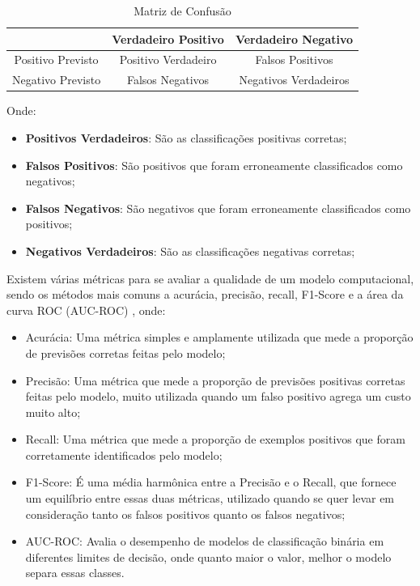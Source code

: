 \documentclass[
    12pt,               %
    openright,          %
    oneside,            %
    a4paper,            %
    english,            %
    brazil              %
    ]{abntex2}
\begin{document}
\begin{table}[H]
    \centering
    \caption{\label{fig:matrix_confusao}Matriz de Confusão}
    \begin{tabular}{|c|c|c|}
    \hline
                      & Verdadeiro Positivo & Verdadeiro Negativo   \\ \hline
    Positivo Previsto & Positivo Verdadeiro & Falsos Positivos      \\ \hline
    Negativo Previsto & Falsos Negativos    & Negativos Verdadeiros \\ \hline
    \end{tabular}
\end{table}

Onde:
\begin{itemize}
    \item \textbf{Positivos Verdadeiros}: São as classificações positivas corretas;
    \item \textbf{Falsos Positivos}: São positivos que foram erroneamente classificados como negativos;
    \item \textbf{Falsos Negativos}: São negativos que foram erroneamente classificados como positivos;
    \item \textbf{Negativos Verdadeiros}: São as classificações negativas corretas;
\end{itemize}

Existem várias métricas para se avaliar a qualidade de um modelo computacional, sendo os métodos mais
comuns a acurácia, precisão, recall, F1-Score e a área da curva ROC (AUC-ROC) \cite{metricas_aval_modelo}, onde:

\begin{itemize}
    \item Acurácia: Uma métrica simples e amplamente utilizada que mede a proporção de previsões corretas feitas pelo modelo;
    \item Precisão: Uma métrica que mede a proporção de previsões positivas corretas feitas pelo modelo, muito utilizada 
quando um falso positivo agrega um custo muito alto;
    \item Recall: Uma métrica que mede a proporção de exemplos positivos que foram corretamente identificados pelo modelo;
    \item F1-Score: É uma média harmônica entre a Precisão e o Recall, que fornece um equilíbrio entre essas duas métricas, utilizado
quando se quer levar em consideração tanto os falsos positivos quanto os falsos negativos;
    \item AUC-ROC: Avalia o desempenho de modelos de classificação binária em diferentes limites de decisão, onde quanto
maior o valor, melhor o modelo separa essas classes.
\end{itemize}
\end{document}
